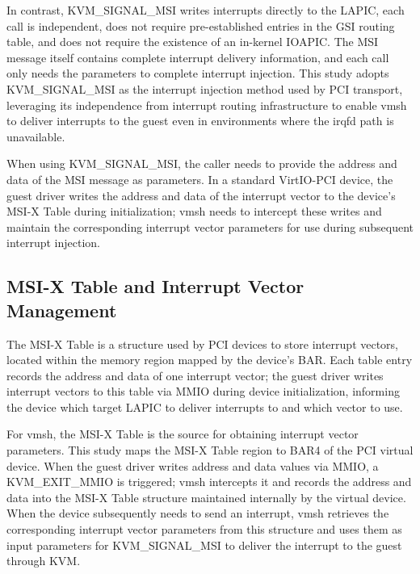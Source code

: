 \begin{ZhChapter}
\begin{sloppypar}
In contrast, KVM\_SIGNAL\_MSI writes interrupts directly to the LAPIC, each call is independent, does not require pre-established entries in the GSI routing table, and does not require the existence of an in-kernel IOAPIC. The MSI message itself contains complete interrupt delivery information, and each call only needs the parameters to complete interrupt injection. This study adopts KVM\_SIGNAL\_MSI as the interrupt injection method used by PCI transport, leveraging its independence from interrupt routing infrastructure to enable vmsh to deliver interrupts to the guest even in environments where the irqfd path is unavailable.
\end{sloppypar}

When using KVM\_SIGNAL\_MSI, the caller needs to provide the address and data of the MSI message as parameters. In a standard VirtIO-PCI device, the guest driver writes the address and data of the interrupt vector to the device's MSI-X Table during initialization; vmsh needs to intercept these writes and maintain the corresponding interrupt vector parameters for use during subsequent interrupt injection.

\subsection{MSI-X Table and Interrupt Vector Management}
\label{sec:msix-table}

The MSI-X Table is a structure used by PCI devices to store interrupt vectors, located within the memory region mapped by the device's BAR. Each table entry records the address and data of one interrupt vector; the guest driver writes interrupt vectors to this table via MMIO during device initialization, informing the device which target LAPIC to deliver interrupts to and which vector to use.

For vmsh, the MSI-X Table is the source for obtaining interrupt vector parameters. This study maps the MSI-X Table region to BAR4 of the PCI virtual device. When the guest driver writes address and data values via MMIO, a KVM\_EXIT\_MMIO is triggered; vmsh intercepts it and records the address and data into the MSI-X Table structure maintained internally by the virtual device. When the device subsequently needs to send an interrupt, vmsh retrieves the corresponding interrupt vector parameters from this structure and uses them as input parameters for KVM\_SIGNAL\_MSI to deliver the interrupt to the guest through KVM.


\end{ZhChapter}
